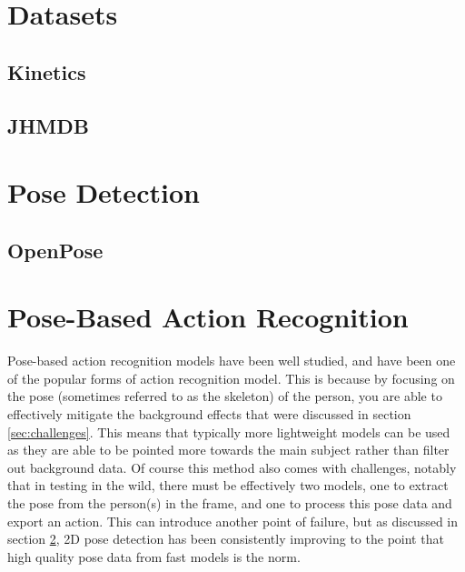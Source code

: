 \section{Datasets}

\subsection{Kinetics}

\subsection{JHMDB}

\section{Pose Detection}
\label{sec:pose-detection}

\subsection{OpenPose}
\label{sec:openpose}

\section{Pose-Based Action Recognition}

Pose-based action recognition models have been well studied, and have been one of the popular forms of action recognition model. This is because by focusing on the pose (sometimes referred to as the skeleton) of the person, you are able to effectively mitigate the background effects that were discussed in section \ref{sec:challenges}. This means that typically more lightweight models can be used as they are able to be pointed more towards the main subject rather than filter out background data. Of course this method also comes with challenges, notably that in testing in the wild, there must be effectively two models, one to extract the pose from the person(s) in the frame, and one to process this pose data and export an action. This can introduce another point of failure, but as discussed in section \ref{sec:pose-detection}, 2D pose detection has been consistently improving to the point that high quality pose data from fast models is the norm.

